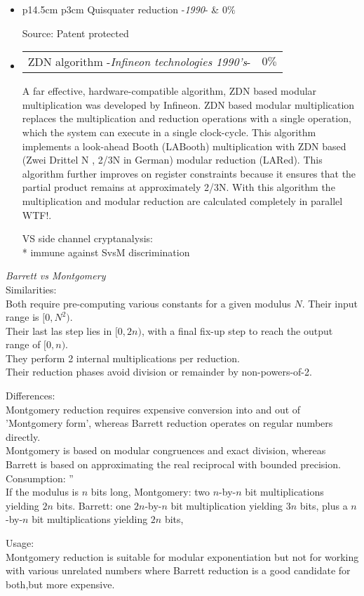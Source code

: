 \begin{itemize}
	\item 
		\begin{tabularx}{\linewidth}{ p{14.5cm} p{3cm} }
		Quisquater reduction -\textit{1990}- & $0\%$  
		\end{tabularx}	
		Source: \cite{birthday-2012-joye}		  
		Patent protected
	\item 
		\begin{tabularx}{\linewidth}{ p{14.5cm} p{3cm}}
		ZDN algorithm -\textit{Infineon technologies 1990's}-  & $0\%$  
		\end{tabularx}
			
		\noindent	
		A far effective, hardware-compatible algorithm, ZDN based modular multiplication
		was developed by Infineon. ZDN based modular multiplication replaces the
		multiplication and reduction operations with a single operation, which the
		system can execute in a single clock-cycle. This algorithm implements a 
		look-ahead Booth (LABooth) multiplication with ZDN based 
		(Zwei Drittel N , 2/3N in German) modular reduction (LARed). 
		This algorithm further improves on register constraints because it ensures
		that the partial product remains at approximately 2/3N. With this algorithm
		the multiplication and modular reduction are calculated completely in parallel
		WTF!.
		\vspace*{3mm}

		VS side channel cryptanalysis:\\
		* immune against SvsM discrimination		  
\end{itemize} 

\textit{Barrett vs Montgomery}\\
Similarities:\\
    Both require pre-computing various constants for a given modulus $N$. Their input range is $[0,N^2)$. \\
    Their last las step lies in $[0,2n)$, with a final fix-up step to reach the output range of $[0,n)$.\\
    They perform 2 internal multiplications per reduction.\\
    Their reduction phases avoid division or remainder by non-powers-of-2.

Differences:\\
    Montgomery reduction requires expensive conversion into and out of 'Montgomery form', whereas Barrett reduction operates on regular numbers directly. \\
    Montgomery is based on modular congruences and exact division, whereas Barrett is based on approximating the real reciprocal with bounded precision. \\

Consumption: ''\\
    If the modulus is $n$ bits long, 
    Montgomery: two $n$-by-$n$ bit multiplications yielding $2n$ bits. 
    Barrett: one $2n$-by-$n$ bit multiplication yielding $3n$ bits, plus a $n$-by-$n$ bit multiplications yielding $2n$ bits, 

Usage:\\
    Montgomery reduction is suitable for modular exponentiation but not for working with various unrelated numbers where Barrett reduction is a good candidate for both,but more expensive.\\